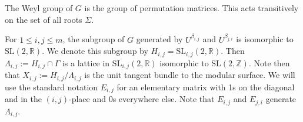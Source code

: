 \documentclass[10pt,reqno]{amsart}
\theoremstyle{Theorem}
\theoremstyle{definition}
\theoremstyle{remark}
\newcommand{\note}[1]{\marginpar{{\color{red}\footnotesize \begin{spacing}{1}#1\end{spacing}}}}
\newcommand{\R}{\mathbb {R}}
\newcommand{\Z}{\mathbb {Z}}
\newcommand{\Sl}{\mathrm{SL}}
\def\SL{\Sl}
\begin{document}
The Weyl group of $G$ is the group of permutation matrices.  This acts transitively on the set of all roots $\Sigma$.

For $1\le i,j\le m$, the subgroup of $G$ generated by $U^{\beta_{i,j}}$ and $U^{\beta_{j,i}}$ is isomorphic to $\Sl(2,\R)$.  We denote this subgroup by  $H_{i,j} = \Sl_{{i,j}}(2,\R).$    Then $\Lambda_{i,j}:=H_{i,j} \cap \Gamma$ is a lattice in $\Sl_{{i,j}}(2,\R)$   isomorphic to $\Sl(2,\Z)$.  %
 Note then that $X_{i,j}:= H_{i,j}/\Lambda_{i,j}$ is the unit tangent bundle to the modular surface.
We will use the standard notation $E_{i,j}$ for an elementary matrix with 1s on the diagonal and in the $(i,j)$-place and 0s everywhere else.  Note that $E_{i,j}$ and $E_{j,i}$ generate $\Lambda_{i,j}$.
\end{document}
